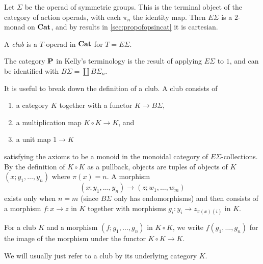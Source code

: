 Let $\Sigma$ be the operad of symmetric groups. This is the terminal object of the category of action operads, with each $\pi_{n}$ the identity map. Then $E\Sigma$ is a $2$-monad on $\mathbf{Cat}$, and by results in \cref{sec:propofopsincat} it is cartesian.

\begin{Defi}
A \textit{club} is a $T$-operad in $\mathbf{Cat}$ for $T = E\Sigma$.
\end{Defi}

\begin{rem}
The category $\mathbf{P}$ in Kelly's terminology is the result of applying $E\Sigma$ to $1$, and can be identified with $B\Sigma = \coprod B\Sigma_{n}$.
\end{rem}

It is useful to break down the definition of a club. A club consists of
\begin{enumerate}
\item a category $K$ together with a functor $K \rightarrow B \Sigma$,
\item a multiplication map $K \circ K \rightarrow K$, and
\item a unit map $1 \rightarrow K$
\end{enumerate}
satisfying the axioms to be a monoid in the monoidal category of $E\Sigma$-collections. By the definition of $K \circ K$ as a pullback, objects are tuples of objects of $K$ $(x; y_{1}, \ldots, y_{n})$ where $\pi(x) = n$. A morphism
  \[
    (x; y_{1}, \ldots, y_{n}) \rightarrow (z; w_{1}, \ldots, w_{m})
  \]
exists only when $n=m$ (since $B\Sigma$ only has endomorphisms) and then consists of a morphism $f \colon x \rightarrow z$ in $K$ together with morphisms $g_{i} \colon y_{i} \rightarrow z_{\pi(x)(i)}$ in $K$.

\begin{nota}\label{nota:clubmult}
For a club $K$ and a morphism $(f; g_{1}, \ldots, g_{n})$ in $K \circ K$, we write $f(g_{1}, \ldots, g_{n})$ for the image of the morphism under the functor $K \circ K \rightarrow K$.
\end{nota}

We will usually just refer to a club by its underlying category $K$.


